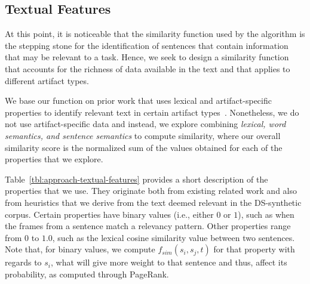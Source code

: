 



\subsection{Textual Features}


At this point, it is noticeable that the similarity function used by the algorithm is the stepping stone for the identification of sentences that contain information that may be relevant to a task.  
Hence, we seek to design a similarity function that accounts for the richness of data available in the text and that applies to different artifact types.



We base our function on prior work that uses lexical and artifact-specific properties
to identify relevant text in certain artifact types~\cite{Ponzanelli2015, Xu2017,Lotufo2012}.
Nonetheless, we do not use artifact-specific data and instead, we explore combining \textit{lexical, word semantics, and sentence semantics} to 
compute similarity, where our overall similarity score is the normalized sum of the values obtained for each of the properties that we explore.



Table~\ref{tbl:approach-textual-features} provides a short description of the properties that we use. 
They originate both from existing related work and also from heuristics that we derive from the text deemed relevant
in the \acs{DS-synthetic} corpus.
Certain properties have binary values (i.e., either $0$ or $1$), such as when the frames from a sentence 
match a relevancy pattern. Other properties range from $0$ to $1.0$, such as
the lexical cosine similarity value between two sentences.
Note that, for binary values, we compute $f_{sim}(s_i, s_j, t)$ for that property
with regards to $s_i$, what will give more weight to that sentence and thus, affect 
its probability, as computed through PageRank.



















